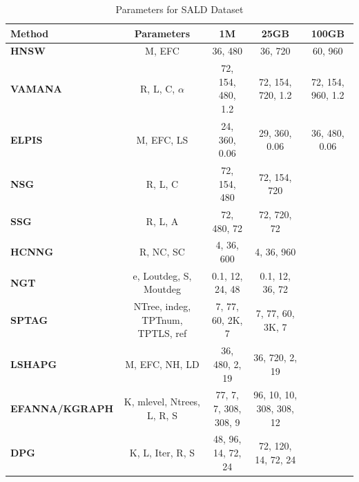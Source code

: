 \begin{table}[h!]
\centering
\caption{Parameters for SALD Dataset}
\scriptsize
\begin{tabularx}{\textwidth}{lCCCC}
\toprule
\textbf{Method} & \textbf{Parameters} & \textbf{1M} & \textbf{25GB} & \textbf{100GB} \\
\midrule
\textbf{HNSW} & M, EFC & 36, 480 & 36, 720 & 60, 960 \\
\textbf{VAMANA} & R, L, C, $\alpha$ & 72, 154, 480, 1.2 & 72, 154, 720, 1.2 & 72, 154, 960, 1.2 \\
\textbf{ELPIS} & M, EFC, LS & 24, 360, 0.06 & 29, 360, 0.06 & 36, 480, 0.06 \\
\textbf{NSG} & R, L, C & 72, 154, 480 & 72, 154, 720 & \\
\textbf{SSG} & R, L, A & 72, 480, 72 & 72, 720, 72 & \\
\textbf{HCNNG} & R, NC, SC & 4, 36, 600 & 4, 36, 960 & \\
\textbf{NGT} & e, Loutdeg, S, Moutdeg & 0.1, 12, 24, 48 & 0.1, 12, 36, 72 & \\
\textbf{SPTAG} & NTree, indeg, TPTnum, TPTLS, ref & 7, 77, 60, 2K, 7 & 7, 77, 60, 3K, 7 & \\
\textbf{LSHAPG} & M, EFC, NH, LD & 36, 480, 2, 19 & 36, 720, 2, 19 & \\
\textbf{EFANNA/KGRAPH} & K, mlevel, Ntrees, L, R, S & 77, 7, 7, 308, 308, 9 & 96, 10, 10, 308, 308, 12 & \\
\textbf{DPG} & K, L, Iter, R, S & 48, 96, 14, 72, 24 & 72, 120, 14, 72, 24 & \\
\bottomrule
\end{tabularx}
\end{table}

